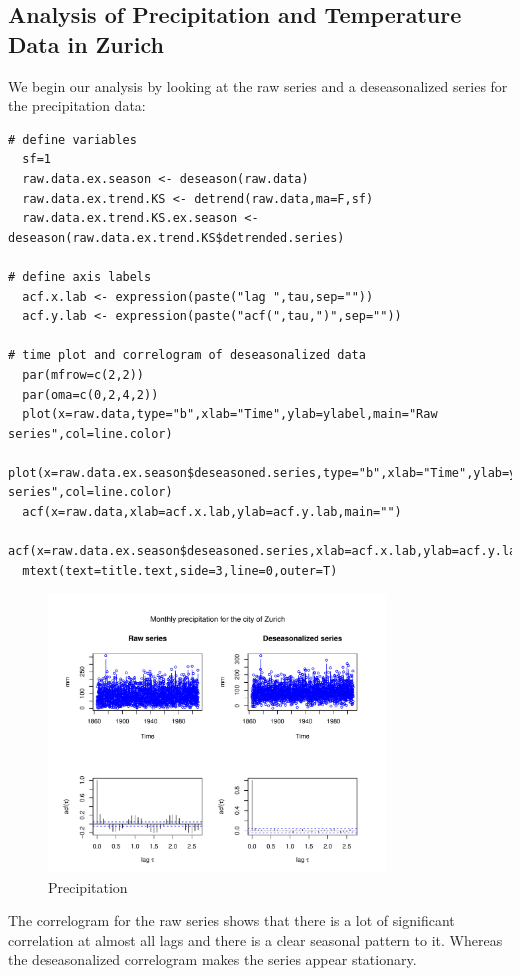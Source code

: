 \subsection{Analysis of Precipitation and Temperature Data in Zurich}

We begin our analysis by looking at the raw series and a deseasonalized series for the precipitation data:

\begin{lstlisting}
# define variables
  sf=1
  raw.data.ex.season <- deseason(raw.data)
  raw.data.ex.trend.KS <- detrend(raw.data,ma=F,sf)
  raw.data.ex.trend.KS.ex.season <- deseason(raw.data.ex.trend.KS$detrended.series)
  
# define axis labels
  acf.x.lab <- expression(paste("lag ",tau,sep=""))
  acf.y.lab <- expression(paste("acf(",tau,")",sep=""))

# time plot and correlogram of deseasonalized data 
  par(mfrow=c(2,2))
  par(oma=c(0,2,4,2))
  plot(x=raw.data,type="b",xlab="Time",ylab=ylabel,main="Raw series",col=line.color)
  plot(x=raw.data.ex.season$deseasoned.series,type="b",xlab="Time",ylab=ylabel,main="Deseasonalized series",col=line.color)
  acf(x=raw.data,xlab=acf.x.lab,ylab=acf.y.lab,main="")
  acf(x=raw.data.ex.season$deseasoned.series,xlab=acf.x.lab,ylab=acf.y.lab,main="")
  mtext(text=title.text,side=3,line=0,outer=T)
\end{lstlisting}

\begin{figure}[H]
\centering
\includegraphics[width=0.8\textwidth]{plots/ZHP1.pdf}
\caption{Precipitation}
\end{figure}

The correlogram for the raw series shows that there is a lot of significant correlation at almost all lags and there is a clear seasonal pattern to it. Whereas the deseasonalized correlogram makes the series appear stationary. \\


